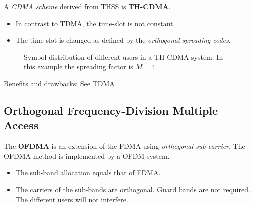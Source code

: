 \begin{refsection}
A \emph{\ac{CDMA} scheme} derived from \ac{THSS} is  \textbf{\acf{TH-CDMA}}.
\begin{itemize}
	\item In contrast to \ac{TDMA}, the time-slot is not constant.
	\item The time-slot is changed as defined by the \emph{orthogonal spreading codes}.
\end{itemize}

\begin{figure}[H]
	\centering
	\caption[Symbol distribution of different users in a \acs{TH-CDMA} system]{Symbol distribution of different users in a \acs{TH-CDMA} system. In this example the spreading factor is $M = 4$.}
\end{figure}

Benefits and drawbacks: See \ac{TDMA}

\subsection{Orthogonal Frequency-Division Multiple Access}

The  \textbf{\acf{OFDMA}} is an extension of the \ac{FDMA} using \emph{orthogonal sub-carrier}. The \ac{OFDMA} method is implemented by a \ac{OFDM} system.
\begin{itemize}
	\item The sub-band allocation equals that of \ac{FDMA}.
	\item The carriers of the sub-bands are orthogonal. Guard bands are not required. The different users will not interfere.
\end{itemize}



\end{refsection}
